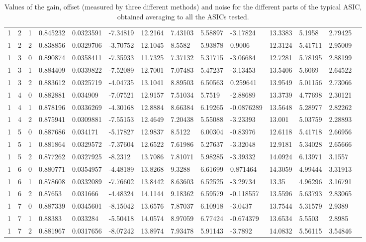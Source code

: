 \documentclass[main.tex]{subfiles}
\begin{document}
\begin{table}
{\begin{tabular}{llllllllllllll}
      1 & 2 & 1 &   0.845232 & 0.0323591 & -7.34819 & 12.2164 & 7.43103 & 5.58897 & -3.17824 & 13.3383 & 5.1958 & 2.79425 \\
      1 & 2 & 2 &   0.838856 & 0.0329706 & -3.70752 & 12.1045 & 8.5582 & 5.93878 & 0.9006 & 12.3124 & 5.41711 & 2.95009 \\
      1 & 3 & 0 &   0.890874 & 0.0358411 & -7.35933 & 11.7325 & 7.37132 & 5.31715 & -3.06684 & 12.7281 & 5.78195 & 2.88199 \\
      1 & 3 & 1 &   0.884409 & 0.0339822 & -7.52089 & 12.7001 & 7.07483 & 5.47237 & -3.13453 & 13.5406 & 5.6069 & 2.64522 \\
      1 & 3 & 2 &   0.883612 & 0.0325719 & -4.04735 & 13.1041 & 8.89503 & 6.50563 & 0.259641 & 13.9549 & 5.01156 & 2.73066 \\
      1 & 4 & 0 &   0.882881 & 0.034909 & -7.07521 & 12.9157 & 7.51034 & 5.7519 & -2.88689 & 13.3739 & 4.77698 & 2.30121 \\
      1 & 4 & 1 &   0.878196 & 0.0336269 & -4.30168 & 12.8884 & 8.66384 & 6.19265 & -0.0876289 & 13.5648 & 5.28977 & 2.82262 \\
      1 & 4 & 2 &   0.875941 & 0.0309881 & -7.55153 & 12.4649 & 7.20438 & 5.55088 & -3.23393 & 13.001 & 5.03759 & 2.28893 \\
      1 & 5 & 0 &   0.887686 & 0.034171 & -5.17827 & 12.9837 & 8.5122 & 6.00304 & -0.83976 & 12.6118 & 5.41718 & 2.66956 \\
      1 & 5 & 1 &   0.881864 & 0.0329572 & -7.37604 & 12.6522 & 7.61986 & 5.27637 & -3.32048 & 12.9181 & 5.34028 & 2.65666 \\
      1 & 5 & 2 &   0.877262 & 0.0327925 & -8.2312 & 13.7086 & 7.81071 & 5.98285 & -3.39332 & 14.0924 & 6.13971 & 3.1557 \\
      1 & 6 & 0 &   0.880771 & 0.0354957 & -4.48189 & 13.8268 & 9.3288 & 6.61699 & 0.871464 & 14.3059 & 4.99444 & 3.31913 \\
      1 & 6 & 1 &   0.878608 & 0.0332089 & -7.76602 & 13.8442 & 8.63603 & 6.52525 & -3.29734 & 13.35 & 4.96296 & 3.16791 \\
      1 & 6 & 2 &   0.87653 & 0.031666 & -4.48324 & 14.1144 & 9.18362 & 6.59579 & -0.118557 & 13.5596 & 5.63793 & 2.83065 \\
      1 & 7 & 0 &   0.887339 & 0.0345601 & -8.15042 & 13.6576 & 7.87037 & 6.10918 & -3.0437 & 13.7544 & 5.31579 & 2.9389 \\
      1 & 7 & 1 &   0.88383 & 0.033284 & -5.50418 & 14.0574 & 8.97059 & 6.77424 & -0.674379 & 13.6534 & 5.5503 & 2.8985 \\
      1 & 7 & 2 &   0.881967 & 0.0317656 & -8.07242 & 13.8974 & 7.93478 & 5.91143 & -3.7892 & 14.0832 & 5.56115 & 3.54846 \\
\hline

  \end{tabular}}
  \caption{Values of the gain, offset (measured by three different methods) and noise for the different parts of the typical ASIC, obtained averaging to all the ASICs tested.}
  \label{tab:allasicsdata}
\end{table}
\end{document}
